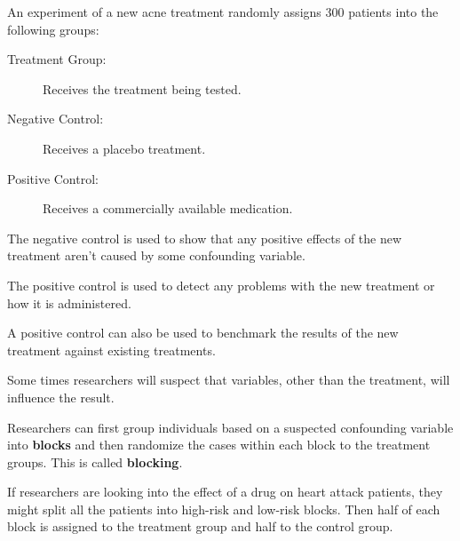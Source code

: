 \documentclass{beamer}
\begin{document}
\begin{frame}
\begin{example}
An experiment of a new acne treatment randomly assigns 300 patients into the following groups:
\begin{description}
\item[Treatment Group:] Receives the treatment being tested.
\item[Negative Control:] Receives a placebo treatment.
\item[Positive Control:] Receives a commercially available medication.
\end{description}
\end{example}\pause

\begin{note}
The negative control is used to show that any positive effects of the new treatment aren't caused by some confounding variable.

\vspace{2mm}
The positive control is used to detect any problems with the new treatment or how it is administered.
\end{note}\pause

\begin{note}
A positive control can also be used to benchmark the results of the new treatment against existing treatments.
\end{note}
\end{frame}

\begin{frame}
\begin{note}
Some times researchers will suspect that variables, other than the treatment, will influence the result.
\end{note}\pause

\begin{definition}
Researchers can first group individuals based on a suspected confounding variable into \textbf{blocks} and then randomize the cases within each block to the treatment groups. This is called \textbf{blocking}.
\end{definition}\pause

\begin{example}
If researchers are looking into the effect of a drug on heart attack patients, they might split all the patients into high-risk and low-risk blocks. Then half of each block is assigned to the treatment group and half to the control group.
\end{example}
\end{frame}
\end{document}
